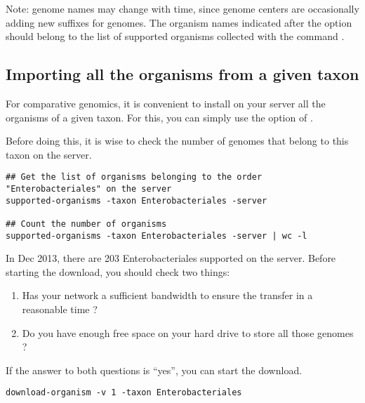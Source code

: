 Note: genome names may change with time, since genome centers are
occasionally adding new suffixes for genomes. The organism names
indicated after the option  should belong to the list of
supported organisms collected with the command
.


\subsection{Importing all the organisms from a given taxon}

For comparative genomics, it is convenient to install on your server
all the organisms of a given taxon. For this, you can simply use the
option  of .

Before doing this, it is wise to check the number of genomes that
belong to this taxon on the server.

\begin{lstlisting}
## Get the list of organisms belonging to the order "Enterobacteriales" on the server
supported-organisms -taxon Enterobacteriales -server

## Count the number of organisms
supported-organisms -taxon Enterobacteriales -server | wc -l
\end{lstlisting}

In Dec 2013, there are 203 Enterobacteriales supported on the \RSAT
server. Before starting the download, you should check two things:
\begin{enumerate}
\item Has your network a sufficient bandwidth to ensure the transfer
  in a reasonable time ?
\item Do you have enough free space on your hard drive to store all those genomes ? 
\end{enumerate}

If the answer to both questions is ``yes'', you can start the
download.

\begin{lstlisting}
download-organism -v 1 -taxon Enterobacteriales 
\end{lstlisting}



